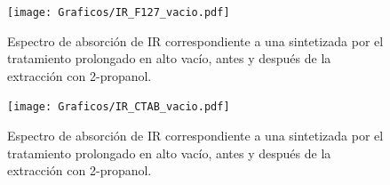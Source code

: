          \begin{figure}[tbh!]
			 	\begin{center}
			 	\texttt{[image: Graficos/IR\_F127\_vacio.pdf]}
			 	\caption[FTIR \pdmF\space tratamiento prolongado.]{Espectro de absorción de IR correspondiente a una \pdmF\space sintetizada por el tratamiento prolongado en alto vacío, antes y después de la extracción con 2-propanol.}
			 	\label{fig:IR_F127_vacio}
			 	\end{center}
			 	\end{figure}
						
		 \begin{figure}[tbh!]
			 	\begin{center}
			 	\texttt{[image: Graficos/IR\_CTAB\_vacio.pdf]}
			 	\caption[FTIR \pdmC\space tratamiento prolongado.]{Espectro de absorción de IR correspondiente a una \pdmC\space sintetizada por el tratamiento prolongado en alto vacío, antes y después de la extracción con 2-propanol.}
			 	\label{fig:IR_CTAB_vacio}
			 	\end{center}
			 	\end{figure}

    	
    	
